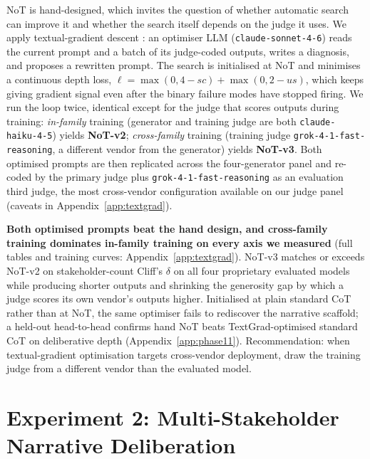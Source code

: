 \documentclass[11pt]{article}
\begin{document}
NoT is hand-designed, which invites the question of whether automatic search
can improve it and whether the search itself depends on the judge it uses. We
apply textual-gradient descent \citep{yuksekgonul2024textgrad}: an optimiser
LLM (\texttt{claude-sonnet-4-6}) reads the current prompt and a batch of
its judge-coded outputs, writes a diagnosis, and proposes a rewritten
prompt. The search is initialised at NoT and minimises a continuous depth loss,
$\ell = \max(0,4-\mathit{sc}) + \max(0,2-\mathit{us})$, which keeps
giving gradient signal even after the binary failure modes have
stopped firing. We run the loop twice, identical
except for the judge that scores outputs during training:
\emph{in-family} training (generator and training judge are both
\texttt{claude-haiku-4-5}) yields \textbf{NoT-v2}; \emph{cross-family}
training (training judge
\texttt{grok-4-1-fast-reasoning}, a different vendor from the
generator) yields \textbf{NoT-v3}.
Both optimised prompts are then replicated across the four-generator
panel and re-coded by the primary judge plus
\texttt{grok-4-1-fast-reasoning} as an evaluation third judge, the
most cross-vendor configuration available on our judge panel
(caveats in Appendix~\ref{app:textgrad}).

\textbf{Both optimised prompts beat the hand design, and cross-family training
dominates in-family training on every axis we measured} (full tables and
training curves: Appendix~\ref{app:textgrad}). NoT-v3 matches or exceeds
NoT-v2 on stakeholder-count Cliff's $\delta$ on all four proprietary
evaluated models while producing shorter outputs and shrinking the
generosity gap by which a judge scores its own vendor's outputs
higher. Initialised at plain standard CoT
rather than at NoT, the same optimiser fails to rediscover the
narrative scaffold; a held-out head-to-head confirms hand NoT beats
TextGrad-optimised standard CoT
on deliberative depth (Appendix~\ref{app:phase11}). Recommendation:
when textual-gradient optimisation targets cross-vendor deployment, draw
the training judge from a different vendor than the evaluated model.

\section{Experiment 2: Multi-Stakeholder Narrative Deliberation}
\label{sec:exp2}
\end{document}
